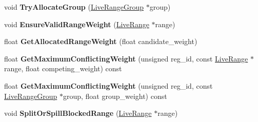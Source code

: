 \begin{DoxyCompactItemize}
\item 
void {\bfseries Try\+Allocate\+Group} (\hyperlink{classv8_1_1internal_1_1compiler_1_1_live_range_group}{Live\+Range\+Group} $\ast$group)\hypertarget{classv8_1_1internal_1_1compiler_1_1_greedy_allocator_aa01d02a630b01b15629323f6e0737ef4}{}\label{classv8_1_1internal_1_1compiler_1_1_greedy_allocator_aa01d02a630b01b15629323f6e0737ef4}

\item 
void {\bfseries Ensure\+Valid\+Range\+Weight} (\hyperlink{classv8_1_1internal_1_1compiler_1_1_live_range}{Live\+Range} $\ast$range)\hypertarget{classv8_1_1internal_1_1compiler_1_1_greedy_allocator_a7bd47ccc48781323e4ebf36d492059c4}{}\label{classv8_1_1internal_1_1compiler_1_1_greedy_allocator_a7bd47ccc48781323e4ebf36d492059c4}

\item 
float {\bfseries Get\+Allocated\+Range\+Weight} (float candidate\+\_\+weight)\hypertarget{classv8_1_1internal_1_1compiler_1_1_greedy_allocator_ab4e00bd4176453863cb7f771f08e9211}{}\label{classv8_1_1internal_1_1compiler_1_1_greedy_allocator_ab4e00bd4176453863cb7f771f08e9211}

\item 
float {\bfseries Get\+Maximum\+Conflicting\+Weight} (unsigned reg\+\_\+id, const \hyperlink{classv8_1_1internal_1_1compiler_1_1_live_range}{Live\+Range} $\ast$range, float competing\+\_\+weight) const \hypertarget{classv8_1_1internal_1_1compiler_1_1_greedy_allocator_aa2a5a0525b802d5709524508fb008aea}{}\label{classv8_1_1internal_1_1compiler_1_1_greedy_allocator_aa2a5a0525b802d5709524508fb008aea}

\item 
float {\bfseries Get\+Maximum\+Conflicting\+Weight} (unsigned reg\+\_\+id, const \hyperlink{classv8_1_1internal_1_1compiler_1_1_live_range_group}{Live\+Range\+Group} $\ast$group, float group\+\_\+weight) const \hypertarget{classv8_1_1internal_1_1compiler_1_1_greedy_allocator_a57e77f2c719318e03face57043868bbf}{}\label{classv8_1_1internal_1_1compiler_1_1_greedy_allocator_a57e77f2c719318e03face57043868bbf}

\item 
void {\bfseries Split\+Or\+Spill\+Blocked\+Range} (\hyperlink{classv8_1_1internal_1_1compiler_1_1_live_range}{Live\+Range} $\ast$range)\hypertarget{classv8_1_1internal_1_1compiler_1_1_greedy_allocator_a3beae70cda05006fd9f8aeaba055401e}{}\label{classv8_1_1internal_1_1compiler_1_1_greedy_allocator_a3beae70cda05006fd9f8aeaba055401e}


\end{DoxyCompactItemize}
